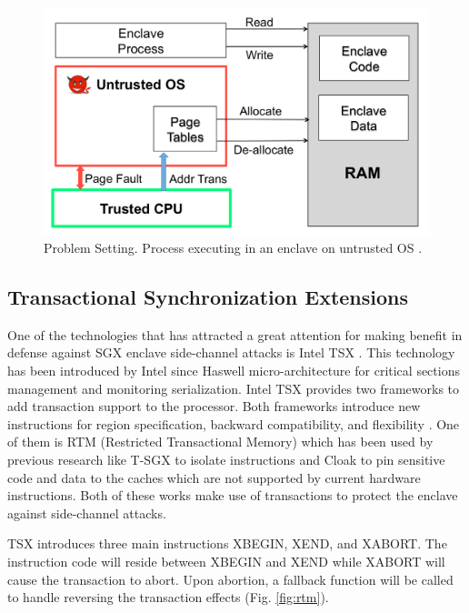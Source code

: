 
\begin{figure}
	\includegraphics[scale=0.2]{images/uos1}
	\caption{Problem Setting. Process executing in an enclave on untrusted OS \cite{pigeonhole}.}
	\label{fig:uos}
\end{figure}

\subsection{Transactional Synchronization Extensions}
One of the technologies that has attracted a great attention for making benefit in defense against SGX enclave side-channel attacks is Intel TSX \cite{tsx}. This technology has been introduced by Intel since Haswell micro-architecture \cite{haswell} for critical sections management and monitoring serialization. Intel TSX provides two frameworks to add transaction support to the processor. Both frameworks introduce new instructions for region specification, backward compatibility, and flexibility \cite{tsx}. One of them is RTM (Restricted Transactional Memory) \cite{rtm} which has been used by previous research like T-SGX \cite{tsgx} to isolate instructions and Cloak \cite{cloak} to pin sensitive code and data to the caches which are not supported by current hardware instructions. Both of these works make use of transactions to protect the enclave against side-channel attacks.

TSX introduces three main instructions XBEGIN, XEND, and XABORT. The instruction code will reside between XBEGIN and XEND while XABORT will cause the transaction to abort. Upon abortion, a fallback function will be called to handle reversing the transaction effects (Fig. \ref{fig:rtm}).


